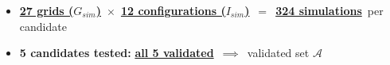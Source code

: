 \begin{frame}{}

\vspace{0.4cm}
\begin{itemize}\small\setlength\itemsep{1.0cm}
    \item \href{https://luminousrobots.github.io/RoASt-exec1-classes/grid_definitions.txt}{\textcolor{accent}{\textbf{27 grids ($G_{sim}$)}}}~$\times$~\href{https://luminousrobots.github.io/RoASt-exec1-classes/initial_configs_viewer}{\textcolor{accent}{\textbf{12 configurations ($I_{sim}$)}}}~$=$~\href{https://luminousrobots.github.io/RoASt-exec1-classes/_all_possible_configurations.log}{\textcolor{accent}{\textbf{324 simulations}}}~per candidate \pause
    
    \item \textbf{5 candidates tested:} \href{https://luminousrobots.github.io/RoASt-Executions/Exec1_Algo1_Pole_Goals1_Main/viewer.html}{\textcolor{accent}{\textbf{all 5 validated}}}~$\implies$~validated set $\mathcal{A}$
\end{itemize}

\end{frame}
